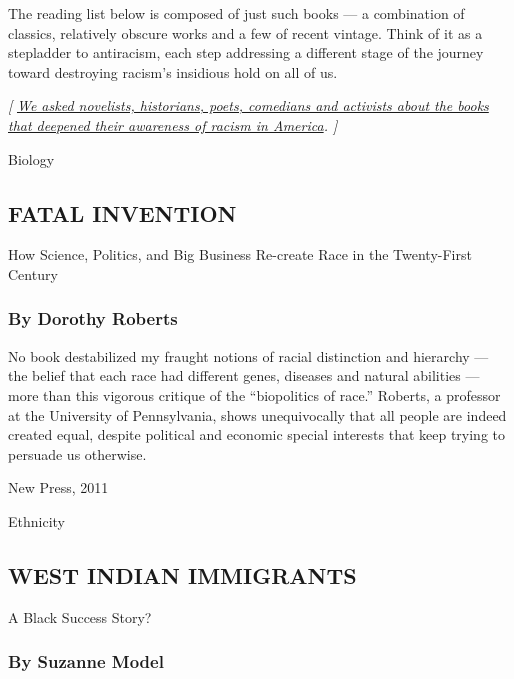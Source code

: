 The reading list below is composed of just such books --- a combination
of classics, relatively obscure works and a few of recent vintage. Think
of it as a stepladder to antiracism, each step addressing a different
stage of the journey toward destroying racism's insidious hold on all of
us.

\emph{{[}}
\href{https://www.nytimes.com/article/books-race-america.html}{\emph{We
asked novelists, historians, poets, comedians and activists about the
books that deepened their awareness of racism in America}}\emph{. {]}}

Biology

\hypertarget{fatal-invention}{%
\subsection{FATAL INVENTION}\label{fatal-invention}}

How Science, Politics, and Big Business Re-create Race in the
Twenty-First Century

\hypertarget{by-dorothy-roberts}{%
\subsubsection{\texorpdfstring{\textbf{By Dorothy
Roberts}}{By Dorothy Roberts}}\label{by-dorothy-roberts}}

No book destabilized my fraught notions of racial distinction and
hierarchy --- the belief that each race had different genes, diseases
and natural abilities --- more than this vigorous critique of the
``biopolitics of race.'' Roberts, a professor at the University of
Pennsylvania, shows unequivocally that all people are indeed created
equal, despite political and economic special interests that keep trying
to persuade us otherwise.

New Press, 2011

Ethnicity

\hypertarget{west-indian-immigrants}{%
\subsection{WEST INDIAN IMMIGRANTS}\label{west-indian-immigrants}}

A Black Success Story?

\hypertarget{by-suzanne-model}{%
\subsubsection{By Suzanne Model}\label{by-suzanne-model}}

